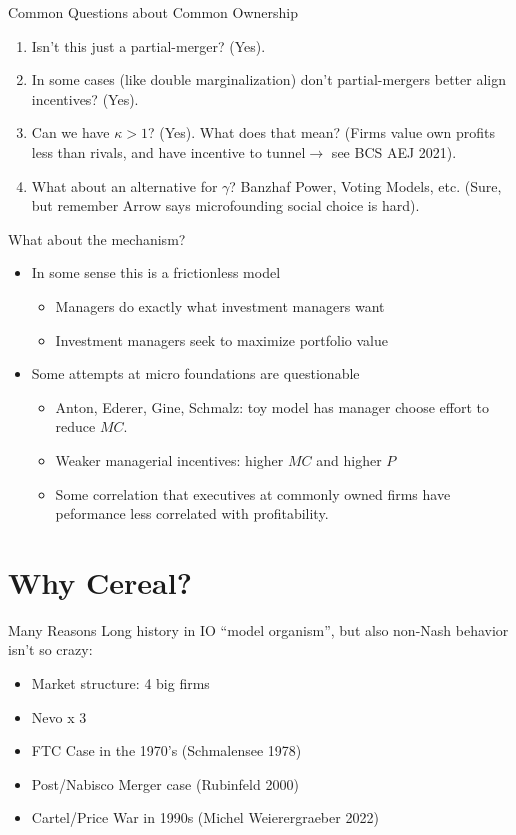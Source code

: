 \documentclass[handout, serif, aspectratio=169, 10pt]{beamer}
\begin{document}
\begin{frame}[plain]{Common Questions about Common Ownership}
\begin{enumerate}
\item Isn't this just a partial-merger? (Yes).
\item In some cases (like double marginalization) don't partial-mergers better align incentives? (Yes).
\item Can we have $\kappa > 1$? (Yes). What does that mean? (Firms value own profits less than rivals, and have incentive to \alert{tunnel}$\rightarrow$ see BCS AEJ 2021).
\item What about an alternative for $\gamma$? Banzhaf Power, Voting Models, etc. (Sure, but remember Arrow says microfounding social choice is hard).
\end{enumerate}
 \end{frame}




\begin{frame}[plain]{What about the mechanism?}
\begin{itemize}
\item In some sense this is a \alert{frictionless} model
\begin{itemize}
  \item Managers do exactly what investment managers want
  \item Investment managers seek to maximize \alert{portfolio value}
\end{itemize}
\item Some attempts at micro foundations are questionable
\begin{itemize}
  \item Anton, Ederer, Gine, Schmalz: toy model has manager choose effort to reduce $MC$.
  \item Weaker managerial incentives: higher $MC$ and higher $P$
  \item Some correlation that executives at commonly owned firms have peformance less correlated with profitability.
\end{itemize}
\end{itemize}
 \end{frame}




\section{Why Cereal?}

\begin{frame}{Many Reasons}
Long history in IO ``model organism'', but also non-Nash behavior isn't so crazy:
\begin{itemize}
\item Market structure: 4 big firms
\item Nevo x 3
\item FTC Case in the 1970's (Schmalensee 1978)
\item Post/Nabisco Merger case (Rubinfeld 2000)
\item Cartel/Price War in 1990s (Michel Weierergraeber 2022)
\end{itemize}
\end{frame}
\end{document}
